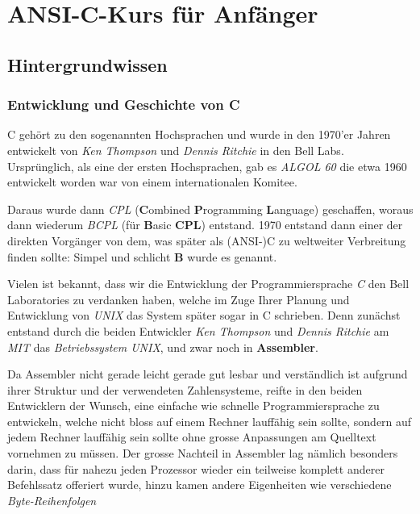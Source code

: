 \documentclass[a4paper,10pt,dvips,fleqn,titlepage,twoside]{book}
\begin{document}
\part{ANSI-C-Kurs für Anfänger}
\label{part:ansic}
\chapter{Hintergrundwissen}
\section{Entwicklung und Geschichte von C}
C gehört zu den sogenannten Hochsprachen und wurde in den 1970'er Jahren entwickelt von \emph{Ken Thompson} und \emph{Dennis Ritchie} in den Bell Labs. Ursprünglich, als eine der ersten Hochsprachen, gab es \emph{ALGOL 60} die etwa 1960 entwickelt worden war von einem internationalen Komitee.

Daraus wurde dann \emph{CPL} (\textbf{C}ombined \textbf{P}rogramming \textbf{L}anguage) geschaffen, woraus dann wiederum \emph{BCPL} (für \textbf{B}asic \textbf{CPL}) entstand. 1970 entstand dann einer der direkten Vorgänger von dem, was später als (ANSI-)C zu weltweiter Verbreitung finden sollte: Simpel und schlicht \textbf{B} wurde es genannt.

Vielen ist bekannt, dass wir die Entwicklung der Programmiersprache \emph{C} den Bell Laboratories zu verdanken haben, welche im Zuge Ihrer Planung und Entwicklung von \emph{UNIX} das System später sogar in C schrieben.
Denn zunächst entstand durch die beiden Entwickler \emph{Ken Thompson} und \emph{Dennis Ritchie} am \emph{MIT} das \emph{Betriebssystem UNIX}, und zwar noch in \textbf{Assembler}.
\newline


Da Assembler nicht gerade leicht gerade gut lesbar und verständlich ist aufgrund ihrer Struktur und der verwendeten Zahlensysteme, reifte in den beiden Entwicklern der Wunsch, eine einfache wie schnelle Programmiersprache zu entwickeln, welche nicht bloss auf einem Rechner lauffähig sein sollte, sondern auf jedem Rechner lauffähig sein sollte ohne grosse Anpassungen am Quelltext vornehmen zu müssen.\newline
Der grosse Nachteil in Assembler lag nämlich besonders darin, dass für nahezu jeden Prozessor wieder ein teilweise komplett anderer Befehlssatz offeriert wurde, hinzu kamen andere Eigenheiten wie verschiedene \textit{Byte-Reihenfolgen}
\end{document}
